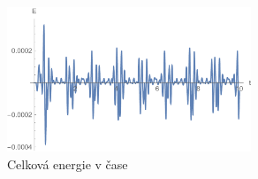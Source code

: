 \documentclass[reqno, a4paper]{amsart}
\begin{document}
\begin{figure}[h]
\begin{flushleft}
\includegraphics[width=0.65\textwidth]{Runge - Kutta, Energie}
\caption*{Celková energie v čase}
\end{flushleft}
\end{figure}


\end{document}
